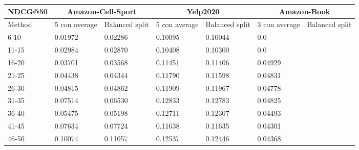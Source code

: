 \begin{table*}[h!]
    \centering
    \begin{tabular}{|l|l|l||l|l||l|l|}
        \hline
        NDCG@50   & \multicolumn{2}{c||}{Amazon-Cell-Sport} & \multicolumn{2}{c||}{Yelp2020} & \multicolumn{2}{c|}{Amazon-Book}                                                   \\ \hline
        Method    & 5 con average                           & Balanced split                 & 5 con average                    & Balanced split & 3 con average & Balanced split \\ \hline
        6-10      & 0.01972                                 & 0.02286                        & 0.10095                          & 0.10044               & 0.0           &                \\ \hline
        11-15     & 0.02984                                 & 0.02870                        & 0.10408                          & 0.10300               & 0.0           &                \\ \hline
        16-20     & 0.03701                                 & 0.03568                        & 0.11451                          & 0.11406               & 0.04929       &                \\ \hline
        21-25     & 0.04438                                 & 0.04344                        & 0.11790                          & 0.11598               & 0.04831       &                \\ \hline
        26-30     & 0.04815                                 & 0.04862                        & 0.11909                          & 0.11967               & 0.04778       &                \\ \hline
        31-35     & 0.07514                                 & 0.06530                        & 0.12833                          & 0.12783               & 0.04825       &                \\ \hline
        36-40     & 0.05475                                 & 0.05198                        & 0.12711                          & 0.12307               & 0.04493       &                \\ \hline
        41-45     & 0.07634                                 & 0.07724                        & 0.11638                          & 0.11635               & 0.04301       &                \\ \hline
        46-50     & 0.10074                                 & 0.11057                        & 0.12537                          & 0.12446               & 0.04368       &                \\ \hline

\end{tabular}
\end{table*}
